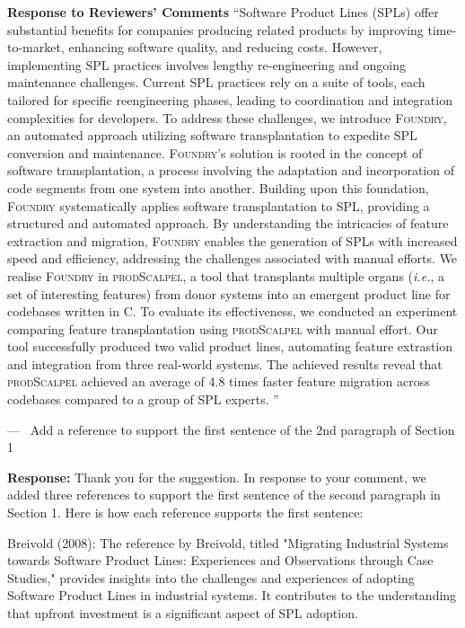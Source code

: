 \documentclass[a4paper,11pt]{letter}
\newcounter{reviewer}
\newcounter{point}[reviewer]
\newcommand{\FOUNDRY}{\textsc{Foundry}\xspace}
\newcommand{\prodscalpel}{\textsc{prodScalpel}\xspace}
\renewcommand{\thepoint}{P\,\thereviewer.\arabic{point}}
\newenvironment{point}
   {\refstepcounter{point} \bigskip \noindent {\textbf{Reviewer~Point~\thepoint} } ---\ }
   {\par }
\newcommand{\response}[1]{\textbf{Response:} \begingroup\color{black}#1\endgroup}
\newcommand{\ie}{\hbox{\emph{i.e.}}\xspace}
\begin{document}
\begin{letter}{\textbf{Response to Reviewers' Comments}}
{``Software Product Lines (SPLs) offer substantial benefits for companies producing related products by improving time-to-market, enhancing software quality, and reducing costs.  However, implementing SPL practices involves lengthy re-engineering and ongoing maintenance challenges. Current SPL practices rely on a suite of tools, each tailored for specific reengineering phases, leading to coordination and integration complexities for developers.
To address these challenges, we introduce \FOUNDRY, an automated approach utilizing software transplantation to expedite SPL conversion and maintenance. \FOUNDRY's solution is rooted in the concept of software transplantation, a process involving the adaptation and incorporation of code segments from one system into another. Building upon this foundation, \FOUNDRY systematically applies software transplantation to SPL, providing a structured and automated approach. By understanding the intricacies of feature extraction and migration, \FOUNDRY enables the generation of SPLs with increased speed and efficiency, addressing the challenges associated with manual efforts.
We realise \FOUNDRY in \prodscalpel, a tool that transplants multiple organs (\ie, a set of interesting features) from donor systems into an emergent product line for codebases written in C. To evaluate its effectiveness, we conducted an experiment comparing feature transplantation using \prodscalpel with manual effort. Our tool successfully produced two valid product lines, automating feature extrastion and integration from three real-world systems. The achieved results reveal that \prodscalpel achieved an average of 4.8 times faster feature migration across codebases compared to a group of SPL experts. ''}

\newpage
\begin{point} 
Add a reference to support the first sentence of the 2nd paragraph of Section 1
\end{point}

\response{
Thank you for the suggestion. In response to your comment, we added three references to support the first sentence of the second paragraph in Section 1. 
Here is how each reference supports the first sentence:

Breivold (2008): The reference by Breivold, titled "Migrating Industrial Systems towards Software Product Lines: Experiences and Observations through Case Studies," provides insights into the challenges and experiences of adopting Software Product Lines in industrial systems. It contributes to the understanding that upfront investment is a significant aspect of SPL adoption.

}
\end{letter}
\end{document}

